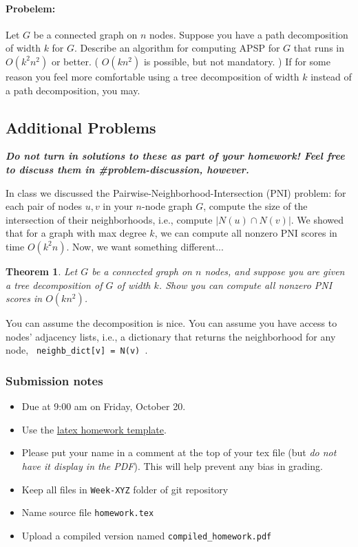 \documentclass{article}
\newtheorem*{theorem}{Theorem}
\begin{document}
\paragraph{Probelem:}
Let $G$ be a connected graph on $n$ nodes. Suppose you have a path decomposition of width $k$ for $G$. Describe an algorithm for computing APSP for $G$ that runs in $O(k^2 n^2)$ or better. ( $O(k n^2)$ is possible, but not mandatory. ) If for some reason you feel more comfortable using a tree decomposition of width $k$ instead of a path decomposition, you may.


\subsection*{Additional Problems}
\textbf{\textit{Do not turn in solutions to these as part of your homework! Feel free to discuss them in \#problem-discussion, however.}}

    In class we discussed the Pairwise-Neighborhood-Intersection (PNI) problem: for each pair of nodes $u, v$ in your $n$-node graph $G$, compute the size of the intersection of their neighborhoods, i.e., compute $| N(u) \cap N(v) |$.
    We showed that for a graph with max degree $k$, we can compute all nonzero PNI scores in time $O( k^2 n)$. Now, we want something different...

\begin{theorem}
    Let $G$ be a connected graph on $n$ nodes, and suppose you are given a tree decomposition of $G$ of width $k$. Show you can compute all nonzero PNI scores in $O(k n^2)$.
\end{theorem}

You can assume the decomposition is nice. You can assume you have access to nodes' adjacency lists, i.e., a dictionary that returns the neighborhood for any node, \verb| neighb_dict[v] = N(v) |.


\vfill

\subsubsection*{Submission notes}
\begin{itemize}
\item Due at 9:00 am on Friday, October 20.
\item Use the \href{https://github.com/bdsullivan/ParameterizedAlgorithms-Fall2017/tree/master/templates/homework}{latex homework template}.
\item Please put your name in a comment at the top of your tex file (but {\it do not
have it display in the PDF}). This will help prevent any bias in grading.
\item Keep all files in \texttt{Week-XYZ} folder of git repository
\item Name source file \texttt{homework.tex}
\item Upload a compiled version named \texttt{compiled\_homework.pdf}
\end{itemize}
\end{document}

